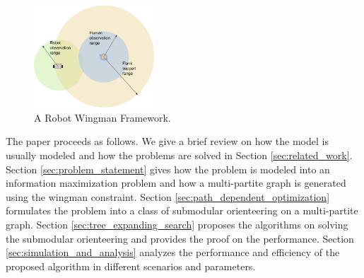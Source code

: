 \begin{figure}[htbp]
\centering
\includegraphics[width=0.4\textwidth]{./images/Wingman.pdf}
\caption{A Robot Wingman Framework.}
\label{fig:Wingman}
\end{figure}

The paper proceeds as follows.
We give a brief review on how the model is usually modeled and how the problems are solved in Section \ref{sec:related_work}.
Section \ref{sec:problem_statement} gives how the problem is modeled into an information maximization problem and how a multi-partite graph is generated using the wingman constraint.
Section \ref{sec:path_dependent_optimization} formulates the problem into a class of submodular orienteering on a multi-partite graph.
Section \ref{sec:tree_expanding_search} proposes the algorithms on solving the submodular orienteering and provides the proof on the  performance.
Section \ref{sec:simulation_and_analysis} analyzes the performance and efficiency of the proposed algorithm in different scenarios and parameters.

